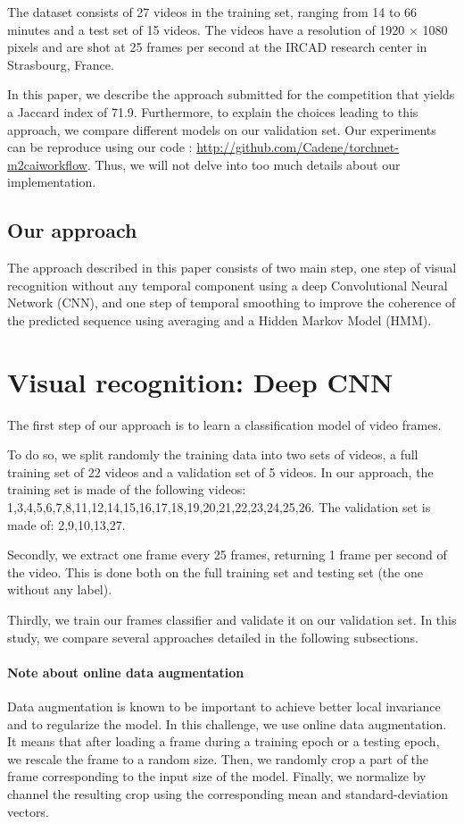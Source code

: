 \documentclass[10pt,twocolumn,letterpaper]{article}
\begin{document}
The dataset consists of 27 videos in the training set, ranging from 14 to 66
minutes and a test set of 15 videos. The videos have a resolution of 1920 $\times$
1080 pixels and are shot at 25 frames per second at the IRCAD research center in
Strasbourg, France.

In this paper, we describe the approach submitted for the competition that yields a Jaccard index of 71.9. Furthermore, to explain the choices leading to this approach, we compare different models on our validation set. Our experiments can be reproduce using our code : \url{http://github.com/Cadene/torchnet-m2caiworkflow}. Thus, we will not delve into too much details about our implementation.

\subsection{Our approach}

The approach described in this paper consists of two main step, one step of visual recognition without any temporal component using a deep Convolutional Neural Network (CNN), and one step of temporal smoothing to improve the coherence of the predicted sequence using averaging and a Hidden Markov Model (HMM).

\section{Visual recognition: Deep CNN}

The first step of our approach is to learn a classification model of video frames.

To do so, we split randomly the training data into two sets of videos, a full training set of 22 videos and a validation set of 5 videos. In our approach, the training set is made of the following videos: 1,3,4,5,6,7,8,11,12,14,15,16,17,18,19,20,21,22,23,24,25,26. The validation set is made of: 2,9,10,13,27.

Secondly, we extract one frame every 25 frames, returning 1 frame per second of the video. This is done both on the full training set and testing set (the one without any label).

Thirdly, we train our frames classifier and validate it on our validation set. In this study, we compare several approaches detailed in the following subsections.

\paragraph{Note about online data augmentation}
Data augmentation is known to be important to achieve better local invariance and to regularize the model.
In this challenge, we use online data augmentation. It means that after loading a frame during a training epoch or a testing epoch, we rescale the frame to a random size. Then, we randomly crop a part of the frame corresponding to the input size of the model. Finally, we normalize by channel the resulting crop using the corresponding mean and standard-deviation vectors. 
\end{document}
